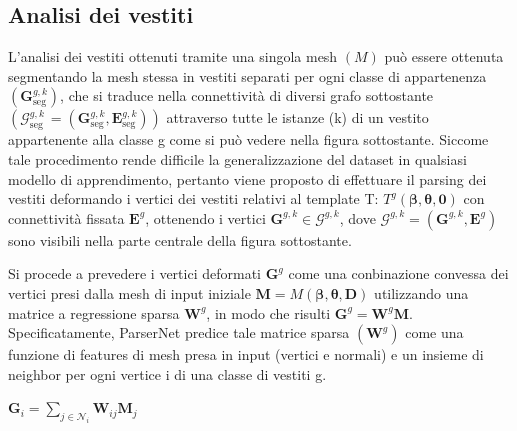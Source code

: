 \subsection{Analisi dei vestiti}

\medskip

L'analisi dei vestiti ottenuti tramite una singola mesh $(M)$ può essere ottenuta segmentando la mesh stessa in vestiti separati per ogni classe di appartenenza $\left(\mathbf{G}_{\mathrm{seg}}^{g, k}\right)$, che si traduce nella connettività di diversi grafo sottostante $\left(\mathcal{G}_{\text {seg }}^{g, k}=\left(\mathbf{G}_{\mathrm{seg}}^{g, k}, \mathbf{E}_{\mathrm{seg}}^{g, k}\right)\right)$ attraverso tutte le istanze (k) di un vestito appartenente alla classe g come si può vedere nella figura sottostante. Siccome tale procedimento rende difficile la generalizzazione del dataset in qualsiasi modello di apprendimento, pertanto viene proposto di effettuare il parsing dei vestiti deformando i vertici dei vestiti relativi al template T: $T^{g}(\boldsymbol{\beta}, \boldsymbol{\theta}, \mathbf{0})$ con connettività fissata $\mathbf{E}^{g}$, ottenendo i vertici $\mathbf{G}^{g, k} \in \mathcal{G}^{g, k}$, dove $\mathcal{G}^{g, k}=\left(\mathbf{G}^{g, k}, \mathbf{E}^{g}\right)$ sono visibili nella parte centrale della figura sottostante.

\medskip

Si procede a prevedere i vertici deformati $\mathbf{G}^{g}$ come una conbinazione convessa dei vertici presi dalla mesh di input iniziale $\mathbf{M}=M(\boldsymbol{\beta}, \boldsymbol{\theta}, \mathbf{D})$ utilizzando una matrice a regressione sparsa $\mathbf{W}^{g}$, in modo che risulti $\mathbf{G}^{g}=\mathbf{W}^{g} \mathbf{M}$. Specificatamente, ParserNet predice tale matrice sparsa $\left(\mathbf{W}^{g}\right)$ come una funzione di features di mesh presa in input (vertici e normali) e un insieme di neighbor per ogni vertice i di una classe di vestiti g.

\medskip

$\mathbf{G}_{i}=\sum_{j \in \mathcal{N}_{i}} \mathbf{W}_{i j} \mathbf{M}_{j}$

\medskip

